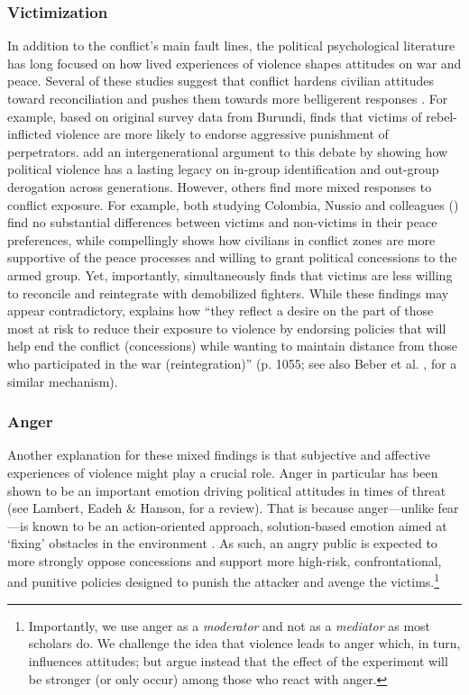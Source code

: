 \subsubsection{Victimization}
In addition to the conflict's main fault lines, the political psychological literature has long focused on how lived experiences of violence shapes attitudes on war and peace. Several of these studies suggest that conflict hardens civilian attitudes toward reconciliation and pushes them towards more belligerent responses \citep{Beber2014, Grossman2015, Hirsch-Hoefler2016a}. For example, based on original survey data from Burundi, \cite{Samii2013b} finds that victims of rebel-inflicted violence are more likely to endorse aggressive punishment of perpetrators. \cite{Lupu2017} add an intergenerational argument to this debate by showing how political violence has a lasting legacy on in-group identification and out-group derogation across generations. However, others find more mixed responses to conflict exposure. For example, both studying Colombia, Nussio and colleagues (\citeyear{Nussio2015}) find no substantial differences between victims and non-victims in their peace preferences, while \cite{Tellez2019b} compellingly shows how civilians in conflict zones are more supportive of the peace processes and willing to grant political concessions to the armed group. Yet, importantly, \cite{Tellez2019b} simultaneously finds that victims are less willing to reconcile and reintegrate with demobilized fighters. While these findings may appear contradictory, \cite{Tellez2019b} explains how ``they reflect a desire on the part of those most at risk to reduce their exposure to violence by endorsing policies that will help end the conflict (concessions) while wanting to maintain distance from those who participated in the war (reintegration)'' (p. 1055; see also Beber et al. \citeyear{Beber2014}, for a similar mechanism).

\subsubsection{Anger}
Another explanation for these mixed findings is that subjective and affective experiences of violence might play a crucial role. Anger in particular has been shown to be an important emotion driving political attitudes in times of threat (see Lambert, Eadeh \& Hanson, \citeyear{Lambert2019} for a review). That is because anger---unlike fear---is known to be an action-oriented approach, solution-based emotion aimed at `fixing' obstacles in the environment \citep{Carver2009}. As such, an angry public is expected to more strongly oppose concessions and support more high-risk, confrontational, and punitive policies designed to punish the attacker and avenge the victims.\footnote{Importantly, we use anger as a \textit{moderator} and not as a \textit{mediator} as most scholars do. We challenge the idea that violence leads to anger which, in turn, influences attitudes; but argue instead that the effect of the experiment will be stronger (or only occur) among those who react with anger.}


